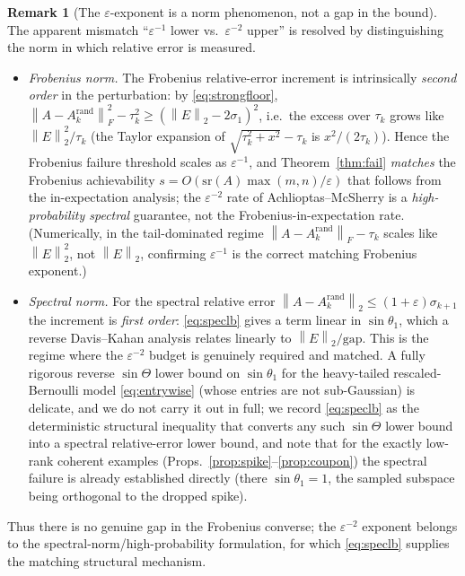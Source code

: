 \documentclass{amsart}
\theoremstyle{definition}
\newtheorem{remark}{Remark}
\newcommand{\Frob}[1]{\left\lVert #1\right\rVert_F}
\newcommand{\Op}[1]{\left\lVert #1\right\rVert_2}
\begin{document}
\begin{remark}[The $\varepsilon$-exponent is a norm phenomenon, not a gap in the bound]\label{rem:eps}
The apparent mismatch ``$\varepsilon^{-1}$ lower vs.\ $\varepsilon^{-2}$ upper''
is resolved by distinguishing the norm in which relative error is measured.
\begin{itemize}
\item \emph{Frobenius norm.} The Frobenius relative-error increment is
intrinsically \emph{second order} in the perturbation: by \eqref{eq:strongfloor},
$\Frob{A-A_k^{\mathrm{rand}}}^2-\tau_k^2\ge(\Op E-2\sigma_1)^2$, i.e.\ the excess
over $\tau_k$ grows like $\Op E^2/\tau_k$ (the Taylor expansion of
$\sqrt{\tau_k^2+x^2}-\tau_k$ is $x^2/(2\tau_k)$). Hence the Frobenius failure
threshold scales as $\varepsilon^{-1}$, and Theorem~\ref{thm:fail} \emph{matches}
the Frobenius achievability $s=O(\mathrm{sr}(A)\max(m,n)/\varepsilon)$ that
follows from the in-expectation analysis; the $\varepsilon^{-2}$ rate of
Achlioptas--McSherry is a \emph{high-probability spectral} guarantee, not the
Frobenius-in-expectation rate. (Numerically, in the tail-dominated regime
$\Frob{A-A_k^{\mathrm{rand}}}-\tau_k$ scales like $\Op E^2$, not $\Op E$,
confirming $\varepsilon^{-1}$ is the correct matching Frobenius exponent.)
\item \emph{Spectral norm.} For the spectral relative error
$\Op{A-A_k^{\mathrm{rand}}}\le(1+\varepsilon)\sigma_{k+1}$ the increment is
\emph{first order}: \eqref{eq:speclb} gives a term linear in $\sin\theta_1$,
which a reverse Davis--Kahan analysis relates linearly to $\Op E/\mathrm{gap}$.
This is the regime where the $\varepsilon^{-2}$ budget is genuinely required and
matched. A fully rigorous reverse $\sin\Theta$ lower bound on $\sin\theta_1$ for
the heavy-tailed rescaled-Bernoulli model \eqref{eq:entrywise} (whose entries are
not sub-Gaussian) is delicate, and we do not carry it out in full; we record
\eqref{eq:speclb} as the deterministic structural inequality that converts any
such $\sin\Theta$ lower bound into a spectral relative-error lower bound, and
note that for the exactly low-rank coherent examples
(Props.~\ref{prop:spike}--\ref{prop:coupon}) the spectral failure is already
established directly (there $\sin\theta_1=1$, the sampled subspace being
orthogonal to the dropped spike).
\end{itemize}
Thus there is no genuine gap in the Frobenius converse; the $\varepsilon^{-2}$
exponent belongs to the spectral-norm/high-probability formulation, for which
\eqref{eq:speclb} supplies the matching structural mechanism.
\end{remark}
\end{document}
